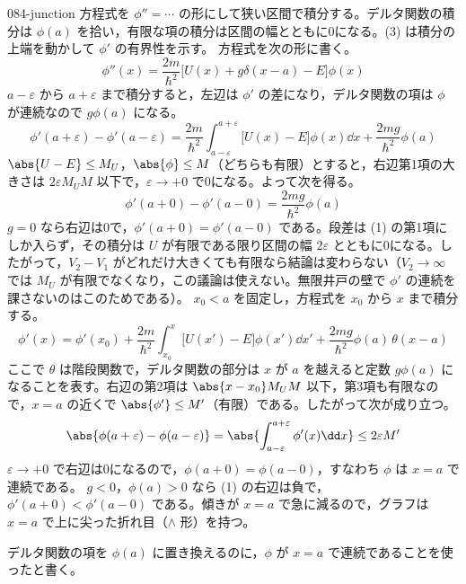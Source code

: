 \documentclass[uplatex,dvipdfmx,a4paper,11pt]{jsarticle}
\begin{document}
\begin{kaisetsu}{084-junction}
\houshin 方程式を $\phi''=\cdots$ の形にして狭い区間で積分する。デルタ関数の積分は $\phi(a)$ を拾い，有限な項の積分は区間の幅とともに0になる。(3) は積分の上端を動かして $\phi'$ の有界性を示す。
\keisan
{} 方程式を次の形に書く。
\[ \phi''(x)=\frac{2m}{\hbar^{2}}\bigl[U(x)+g\delta(x-a)-E\bigr]\phi(x) \]
$a-\varepsilon$ から $a+\varepsilon$ まで積分すると，左辺は $\phi'$ の差になり，デルタ関数の項は $\phi$ が連続なので $g\phi(a)$ になる。
\[ \phi'(a+\varepsilon)-\phi'(a-\varepsilon)=\frac{2m}{\hbar^{2}}\int_{a-\varepsilon}^{a+\varepsilon}\bigl[U(x)-E\bigr]\phi(x)\dd x+\frac{2mg}{\hbar^{2}}\phi(a) \]
$\abs{U-E}\le M_{U}$，$\abs{\phi}\le M$（どちらも有限）とすると，右辺第1項の大きさは $2\varepsilon M_{U}M$ 以下で，$\varepsilon\to+0$ で0になる。よって次を得る。
\[ \phi'(a+0)-\phi'(a-0)=\frac{2mg}{\hbar^{2}}\phi(a) \]
 $g=0$ なら右辺は0で，$\phi'(a+0)=\phi'(a-0)$ である。段差は (1) の第1項にしか入らず，その積分は $U$ が有限である限り区間の幅 $2\varepsilon$ とともに0になる。したがって，$V_{2}-V_{1}$ がどれだけ大きくても有限なら結論は変わらない（$V_{2}\to\infty$ では $M_{U}$ が有限でなくなり，この議論は使えない。無限井戸の壁で $\phi'$ の連続を課さないのはこのためである）。
 $x_{0}<a$ を固定し，方程式を $x_{0}$ から $x$ まで積分する。
\[ \phi'(x)=\phi'(x_{0})+\frac{2m}{\hbar^{2}}\int_{x_{0}}^{x}\bigl[U(x')-E\bigr]\phi(x')\dd x'+\frac{2mg}{\hbar^{2}}\phi(a)\,\theta(x-a) \]
ここで $\theta$ は階段関数で，デルタ関数の部分は $x$ が $a$ を越えると定数 $g\phi(a)$ になることを表す。右辺の第2項は $\abs{x-x_{0}}M_{U}M$ 以下，第3項も有限なので，$x=a$ の近くで $\abs{\phi'}\le M'$（有限）である。したがって次が成り立つ。
\[ \abs{\phi(a+\varepsilon)-\phi(a-\varepsilon)}=\abs{\int_{a-\varepsilon}^{a+\varepsilon}\phi'(x)\dd x}\le 2\varepsilon M' \]
$\varepsilon\to+0$ で右辺は0になるので，$\phi(a+0)=\phi(a-0)$，すなわち $\phi$ は $x=a$ で連続である。
 $g<0$，$\phi(a)>0$ なら (1) の右辺は負で，$\phi'(a+0)<\phi'(a-0)$ である。傾きが $x=a$ で急に減るので，グラフは $x=a$ で上に尖った折れ目（$\wedge$ 形）を持つ。
\begin{ronten}
  \item {} デルタ関数の項を $\phi(a)$ に置き換えるのに，$\phi$ が $x=a$ で連続であることを使ったと書く。

\end{ronten}
\end{kaisetsu}
\end{document}
